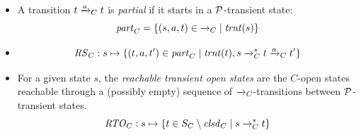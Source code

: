 \documentclass{article}
\begin{document}
\begin{itemize}
\item A transition $t\trans{a}_C t$ is \emph{partial} if it starts in a $\mathcal{P}$-transient state:
%
\[ \Partial_C = \gensetof{(s,a,t)\in {\trans{}_C}}{\Transient(s)} \]

\item 
%
\[ \RS_C : s \mapsto \gensetof{(t,a,t')\in \Partial_C}{\Transient(t), s\trans{}_C^* t\trans a_C t'} \]

\item For a given state $s$, the \emph{reachable transient open states} are the $C$-open states reachable through a (possibly empty) sequence of $\trans{}_C$-transitions between $\mathcal{P}$-transient states.
%
\[ \RTO_C : s \mapsto \gensetof{t\in S_C\setminus \Closed_C}{s\trans{}_C^* t} \]

\end{itemize}
\end{document}
